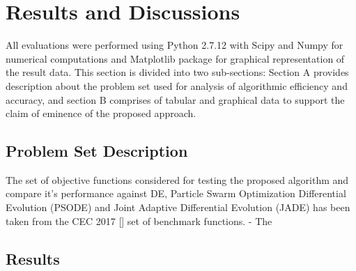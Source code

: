 \documentclass[conference]{IEEEtran}
\begin{document}


\section{Results and Discussions}

All evaluations were performed using Python 2.7.12 with Scipy and Numpy for numerical computations and Matplotlib package for graphical representation of the result data. This section is divided into two sub-sections: Section A provides description about the problem set used for analysis of algorithmic efficiency and accuracy, and section B comprises of tabular and graphical data to support the claim of eminence of the proposed approach.

\subsection{Problem Set Description}

The set of objective functions considered for testing the proposed algorithm and compare it's performance against DE, Particle Swarm Optimization Differential Evolution (PSODE) and Joint Adaptive Differential Evolution (JADE) has been taken from the CEC 2017 [] set of benchmark functions.
- The

\subsection{Results}


%

%
\end{document}
